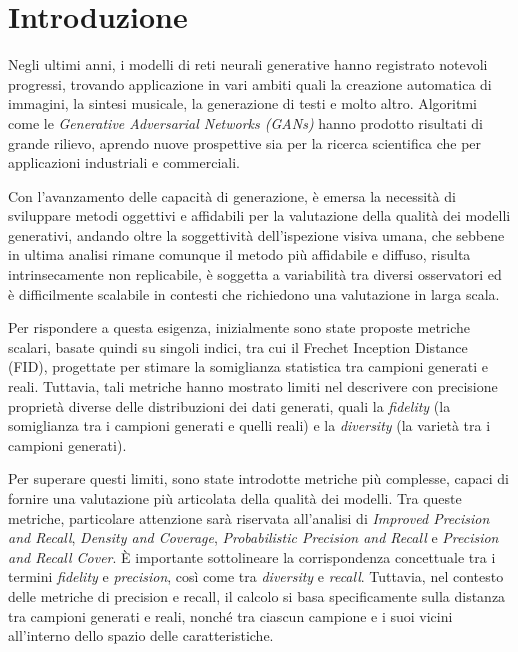 \chapter{Introduzione}\label{ch:introduzione}

Negli ultimi anni, i modelli di reti neurali generative hanno registrato notevoli progressi, trovando applicazione in vari
ambiti quali la creazione automatica di immagini, la sintesi musicale, la generazione di testi e molto altro. 
Algoritmi come le \textit{Generative Adversarial Networks (GANs)} hanno prodotto risultati di grande rilievo, aprendo nuove prospettive 
sia per la ricerca scientifica che per applicazioni industriali e commerciali.

Con l'avanzamento delle capacità di generazione, è emersa la necessità di sviluppare metodi oggettivi e affidabili per la valutazione della qualità dei modelli generativi,
andando oltre la soggettività dell’ispezione visiva umana, che sebbene in ultima analisi rimane comunque il metodo più affidabile e diffuso, 
risulta intrinsecamente non replicabile, è soggetta a variabilità tra diversi osservatori ed è difficilmente scalabile in contesti che richiedono una valutazione in larga scala.

Per rispondere a questa esigenza, inizialmente sono state proposte metriche scalari, basate quindi su singoli indici, tra cui il Frechet Inception Distance (FID), 
progettate per stimare la somiglianza statistica tra campioni generati e reali. 
Tuttavia, tali metriche hanno mostrato limiti nel descrivere con precisione proprietà diverse delle distribuzioni dei dati generati, quali la \textit{fidelity} 
(la somiglianza tra i campioni generati e quelli reali) e la \textit{diversity} (la varietà tra i campioni generati).

Per superare questi limiti, sono state introdotte metriche più complesse, capaci di fornire una valutazione più articolata della qualità dei modelli. 
Tra queste metriche, particolare attenzione sarà riservata all'analisi di \textit{Improved Precision and Recall}, \textit{Density and Coverage}, \textit{Probabilistic Precision and Recall} e \textit{Precision and Recall Cover}. 
È importante sottolineare la corrispondenza concettuale tra i termini \textit{fidelity} e \textit{precision}, così come tra \textit{diversity} e \textit{recall}. 
Tuttavia, nel contesto delle metriche di precision e recall, il calcolo si basa specificamente sulla distanza tra campioni generati e reali, 
nonché tra ciascun campione e i suoi vicini all'interno dello spazio delle caratteristiche. 

